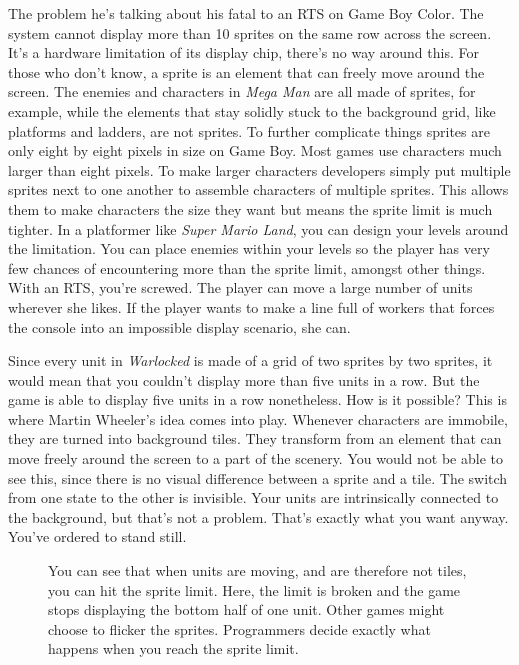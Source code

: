 \documentclass{book}
\begin{document}
The problem he’s talking about his fatal to an RTS on Game Boy Color. The system cannot display more than 10 sprites on the same row across the screen. It’s a hardware limitation of its display chip, there’s no way around this. For those who don’t know, a sprite is an element that can freely move around the screen. The enemies and characters in \emph{Mega Man} are all made of sprites, for example, while the elements that stay solidly stuck to the background grid, like platforms and ladders, are not sprites. To further complicate things sprites are only eight by eight pixels in size on Game Boy. Most games use characters much larger than eight pixels. To make larger characters developers simply put multiple sprites next to one another to assemble characters of multiple sprites. This allows them to make characters the size they want but means the sprite limit is much tighter. In a platformer like \emph{Super Mario Land}, you can design your levels around the limitation. You can place enemies within your levels so the player has very few chances of encountering more than the sprite limit, amongst other things. With an RTS, you’re screwed. The player can move a large number of units wherever she likes. If the player wants to make a line full of workers that forces the console into an impossible display scenario, she can.\par
\FloatBarrier\vspace{\baselineskip}\begin{figure}[H]\end{figure}
Since every unit in \emph{Warlocked} is made of a grid of two sprites by two sprites, it would mean that you couldn’t display more than five units in a row. But the game is able to display five units in a row nonetheless. How is it possible? This is where Martin Wheeler’s idea comes into play. Whenever characters are immobile, they are turned into background tiles. They transform from an element that can move freely around the screen to a part of the scenery. You would not be able to see this, since there is no visual difference between a sprite and a tile. The switch from one state to the other is invisible. Your units are intrinsically connected to the background, but that’s not a problem. That’s exactly what you want anyway. You’ve ordered to stand still.\par
\FloatBarrier\vspace{\baselineskip}\begin{figure}[H]\caption*{You can see that when units are moving, and are therefore not tiles, you can hit the sprite limit. Here, the limit is broken and the game stops displaying the bottom half of one unit. Other games might choose to flicker the sprites. Programmers decide exactly what happens when you reach the sprite limit.}\end{figure}
\end{document}
